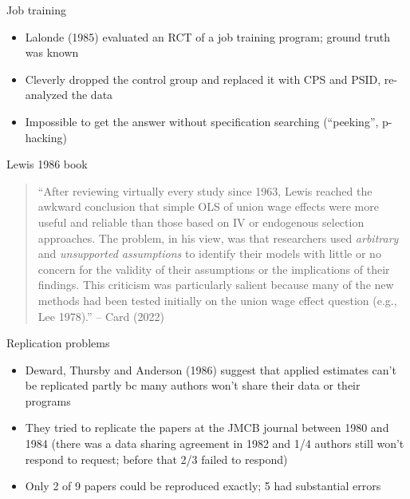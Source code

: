 \documentclass{beamer}
\begin{document}
\begin{frame}{Job training}

\begin{itemize}
\item Lalonde (1985) evaluated an RCT of a job training program; ground truth was known
\item Cleverly dropped the control group and replaced it with CPS and PSID, re-analyzed the data
\item Impossible to get the answer without specification searching (``peeking'', p-hacking)

\end{itemize}

\end{frame}

\begin{frame}{Lewis 1986 book}

\begin{quote}
``After reviewing virtually every study since 1963, Lewis reached the awkward conclusion that simple OLS of union wage effects were more useful and reliable than those based on IV or endogenous selection approaches. The problem, in his view, was that researchers used \emph{arbitrary} and \emph{unsupported assumptions} to identify their models with little or no concern for the validity of their assumptions or the implications of their findings. This criticism was particularly salient because many of the new methods had been tested initially on the union wage effect question (e.g., Lee 1978).'' -- Card (2022)
\end{quote}

\end{frame}

\begin{frame}{Replication problems}

\begin{itemize}
\item Deward, Thursby and Anderson (1986) suggest that applied estimates can't be replicated partly bc many authors won't share their data or their programs
\item They tried to replicate the papers at the JMCB journal between 1980 and 1984 (there was a data sharing agreement in 1982 and 1/4 authors still won't respond to request; before that 2/3 failed to respond)
\item Only 2 of 9 papers could be reproduced exactly; 5 had substantial errors
\end{itemize}

\end{frame}
\end{document}
